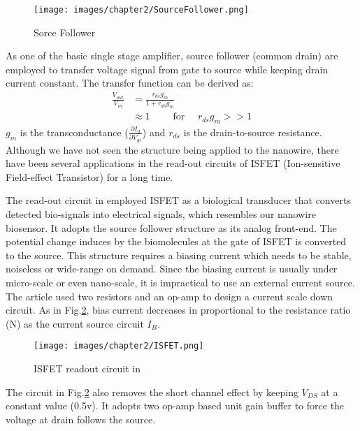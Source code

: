 \begin{figure}[h]
    \centering
    \texttt{[image: images/chapter2/SourceFollower.png]}
    \fontsize{6}{7}\selectfont
    \caption{Sorce Follower}
    \label{fig:SF}
\end{figure}

As one of the basic single stage amplifier, source follower (common drain) are employed to transfer voltage signal from gate to source while keeping drain current constant.
The transfer function can be derived as:
\setlength{\mathindent}{5.5cm}
\begin{align}
    \frac{V_{out}}{V_{in}} & = \frac{r_{ds}g_m}{1 + r_{ds}g_m} \\    \label{eq:sfTF}
                           & \approx 1 \qquad \text{ for } \quad r_{ds}g_m >> 1
\end{align}
$g_m$ is the transconductance ($\frac{\partial I_d}{\partial V_{gs}}$) and $r_{ds}$ is the drain-to-source resistance.
Although we have not seen the structure being applied to the nanowire, there have been several applications in the read-out circuits of ISFET (Ion-sensitive Field-effect Transistor)\cite{SF1, SF2} for a long time.

The read-out circuit in \cite{SF1} employed ISFET as a biological transducer that converts detected bio-signals into electrical signals, which resembles our nanowire biosensor.
It adopts the source follower structure as its analog front-end.
The potential change induces by the biomolecules at the gate of ISFET is converted to the source.
This structure requires a biasing current which needs to be stable, noiseless or wide-range on demand.
Since the biasing current is usually under micro-scale or even nano-scale, it is impractical to use an external current source.
The article \cite{SF1} used two resistors and an op-amp to design a current scale down circuit.
As in Fig.\ref{fig:ISFET}, bias current decreases in proportional to the resistance ratio (N) as the current source circuit $I_B$.

\begin{figure}[h]
    \centering
    \texttt{[image: images/chapter2/ISFET.png]}
    \fontsize{6}{7}\selectfont
    \caption{ISFET readout circuit in \cite{SF1}}
    \label{fig:ISFET}
\end{figure}
The circuit in Fig.\ref{fig:ISFET} also removes the short channel effect by keeping $V_{DS}$ at a constant value (0.5v).
It adopts two op-amp based unit gain buffer to force the voltage at drain follows the source.

